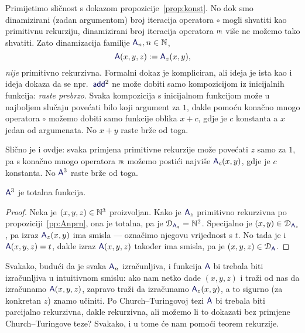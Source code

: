 Primijetimo sličnost s dokazom propozicije~\ref{prop:konst}. No dok smo dinamizirani (zadan argumentom) broj iteracija operatora $\circ$ mogli shvatiti kao primitivnu rekurziju, dinamizirani broj iteracija operatora $\pr$ više ne možemo tako shvatiti. Zato dinamizacija familije $\f A_n,n\in\N$,
\begin{equation}
    \f A(x,y,z):=\f A_z(x,y)\text,
\end{equation}
\emph{nije} primitivno rekurzivna. Formalni dokaz je kompliciran, ali ideja je ista kao i ideja dokaza da se npr.\ $\f{add}^2$ ne može dobiti samo kompozicijom iz inicijalnih funkcija: \emph{raste prebrzo}. Svaka kompozicija s inicijalnom funkcijom može u najboljem slučaju povećati bilo koji argument za $1$, dakle pomoću konačno mnogo operatora $\circ$ možemo dobiti samo funkcije oblika $x+c$, gdje je $c$ konstanta a $x$ jedan od argumenata. No $x+y$ raste brže od toga.

Slično je i ovdje: svaka primjena primitivne rekurzije može povećati $z$ samo za $1$, pa s konačno mnogo operatora $\pr$ možemo postići najviše $\f A_c(x,y)$, gdje je $c$ konstanta. No $\f A^3$ raste brže od toga.

\begin{korolar}\label{kor:A3tot}
$\f A^3$ je totalna funkcija.
\end{korolar}
\begin{proof}
Neka je $(x,y,z)\in{\mathbb N}^3$ proizvoljan. Kako je $\f A_z$ primitivno rekurzivna po propoziciji~\ref{pp:Anprn}, ona je totalna, pa je $\dom{\f A_z}=\N^2$. Specijalno je $(x,y)\in\dom{\f A_z}$, pa izraz $\f A_z(x,y)$ ima smisla --- označimo njegovu vrijednost s $t$. No tada je i $\f A(x,y,z)=t$, dakle izraz $\f A(x,y,z)$ također ima smisla, pa je $(x,y,z)\in\dom{\f A}$.
\end{proof}

Svakako, budući da je svaka $\f A_n$ izračunljiva, i funkcija $\f A$ bi trebala biti izračunljiva u intuitivnom smislu: ako nam netko dade $(x,y,z)$ i traži od nas da izračunamo $\f A(x,y,z)$, zapravo traži da izračunamo $\f A_z(x,y)$, a to sigurno (za konkretan $z$) znamo učiniti. Po Church--\!Turingovoj tezi $\f A$ bi trebala biti parcijalno rekurzivna, dakle rekurzivna, ali možemo li to dokazati bez primjene Church--\!Turingove teze? Svakako, i u tome će nam pomoći teorem rekurzije.

